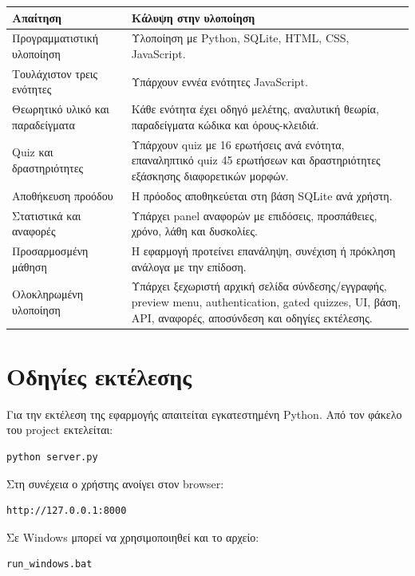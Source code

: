 \documentclass[a4paper]{article}
\newcommand{\textlatin}[1]{\textenglish{#1}}
\begin{document}
\begin{longtable}{|p{5cm}|p{9cm}|}
\hline
\textbf{Απαίτηση} & \textbf{Κάλυψη στην υλοποίηση} \\
\hline
Προγραμματιστική υλοποίηση & Υλοποίηση με \textlatin{Python}, \textlatin{SQLite}, \textlatin{HTML}, \textlatin{CSS}, \textlatin{JavaScript}. \\
\hline
Τουλάχιστον τρεις ενότητες & Υπάρχουν εννέα ενότητες JavaScript. \\
\hline
Θεωρητικό υλικό και παραδείγματα & Κάθε ενότητα έχει οδηγό μελέτης, αναλυτική θεωρία, παραδείγματα κώδικα και όρους-κλειδιά. \\
\hline
Quiz και δραστηριότητες & Υπάρχουν quiz με 16 ερωτήσεις ανά ενότητα, επαναληπτικό quiz 45 ερωτήσεων και δραστηριότητες εξάσκησης διαφορετικών μορφών. \\
\hline
Αποθήκευση προόδου & Η πρόοδος αποθηκεύεται στη βάση SQLite ανά χρήστη. \\
\hline
Στατιστικά και αναφορές & Υπάρχει panel αναφορών με επιδόσεις, προσπάθειες, χρόνο, λάθη και δυσκολίες. \\
\hline
Προσαρμοσμένη μάθηση & Η εφαρμογή προτείνει επανάληψη, συνέχιση ή πρόκληση ανάλογα με την επίδοση. \\
\hline
Ολοκληρωμένη υλοποίηση & Υπάρχει ξεχωριστή αρχική σελίδα σύνδεσης/εγγραφής, preview menu, authentication, gated quizzes, UI, βάση, API, αναφορές, αποσύνδεση και οδηγίες εκτέλεσης. \\
\hline
\end{longtable}

\section{Οδηγίες εκτέλεσης}

Για την εκτέλεση της εφαρμογής απαιτείται εγκατεστημένη \textlatin{Python}. Από τον φάκελο του project εκτελείται:

\begin{lstlisting}
python server.py
\end{lstlisting}

Στη συνέχεια ο χρήστης ανοίγει στον browser:

\begin{lstlisting}
http://127.0.0.1:8000
\end{lstlisting}

Σε Windows μπορεί να χρησιμοποιηθεί και το αρχείο:

\begin{lstlisting}
run_windows.bat
\end{lstlisting}
\end{document}
